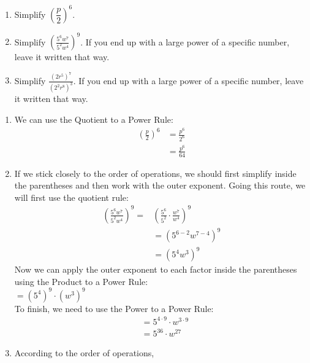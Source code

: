 \documentclass{ximera}
\begin{document}
\begin{example}
\begin{enumerate}
\item Simplify $\left(\dfrac{p}{2}\right)^6$.
        \item  Simplify $\left(\frac{5^6w^7}{5^2w^4}\right)^9$.
                  If you end up with a large power of a specific number,
                  leave it written that way.
\item     Simplify $\frac{\left(2r^5\right)^7}{\left(2^2 r^8\right)^3}$.
                  If you end up with a large power of a specific number,
                  leave it written that way.
\end{enumerate}
\begin{explanation}
\begin{enumerate}
\item    We can use the Quotient to a Power Rule:
\begin{align*}
                    \left(\frac{p}{2}\right)^6 &=\frac{p^6}{2^6}\\
                    &=\frac{p^6}{64}
\end{align*}
        \item If we stick closely to the order of operations,
                  we should first simplify inside the parentheses and then work with the outer exponent.
                  Going this route,
                  we will first use the quotient rule:
\begin{align*}
                   \left(\frac{5^6w^7}{5^2w^4}\right)^9 =&   \left(\frac{5^6}{5^2}\cdot \frac{w^7}{w^4}\right)^9\\
		&= \left(5^{6-2}w^{7-4}\right)^9\\
                    &=  \left(5^{4}w^{3}\right)^9
                    \end{align*}
                    Now we can apply the outer exponent to each factor inside the parentheses using the Product to a Power Rule: \\
                     $= \left(5^{4}\right)^9\cdot \left(w^{3}\right)^9$ \\
                    To finish, we need to use the Power to a Power Rule:
                   \begin{align*}
                    &= 5^{4\cdot 9}\cdot w^{3 \cdot 9}\\
                    &= 5^{36}\cdot w^{27}
\end{align*}
       \item According to the order of operations,

\end{enumerate}
\end{explanation}
\end{example}
\end{document}
